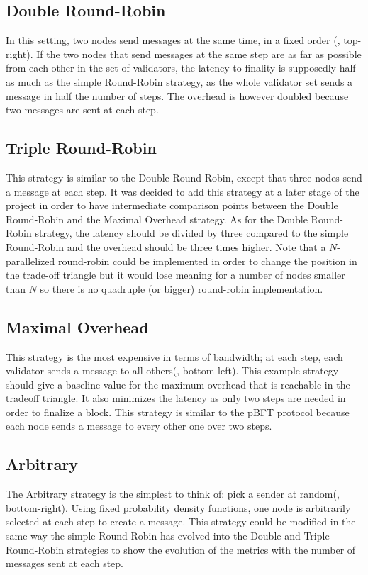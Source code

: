 \subsection{Double Round-Robin}
In this setting, two nodes send messages at the same time, in a fixed order
(, top-right). If the two nodes that send messages at the
same step are as far as possible from each other in the set of validators, the
latency to finality is supposedly half as much as the simple Round-Robin
strategy, as the whole validator set sends a message in half the number of
steps. The overhead is however doubled because two messages are sent at each
step.

\subsection{Triple Round-Robin}
This strategy is similar to the Double Round-Robin, except that three nodes send
a message at each step. It was decided to add this strategy at a later stage of
the project in order to have intermediate comparison points between the Double
Round-Robin and the Maximal Overhead strategy. As for the Double Round-Robin
strategy, the latency should be divided by three compared to the simple
Round-Robin and the overhead should be three times higher.
Note that a \(N\)-parallelized round-robin could be implemented in order to change the
position in the trade-off triangle but it would lose meaning for a number of
nodes smaller than \(N\) so there is no quadruple (or bigger) round-robin
implementation.

\subsection{Maximal Overhead}
This strategy is the most expensive in terms of bandwidth; at each step, each
validator sends a message to all others(, bottom-left). This
example strategy should give a baseline value for the maximum overhead that is
reachable in the tradeoff triangle. It also minimizes the latency as only two
steps are needed in order to finalize a block. This strategy is similar to the
pBFT\cite{pBFT} protocol because each node sends a message to every other one
over two steps.

\subsection{Arbitrary}
The Arbitrary strategy is the simplest to think of: pick a sender at
random(, bottom-right).  Using fixed probability density
functions, one node is arbitrarily selected at each step to create a message.
This strategy could be modified in the same way the simple Round-Robin has
evolved into the Double and Triple Round-Robin strategies to show the evolution
of the metrics with the number of messages sent at each step.


